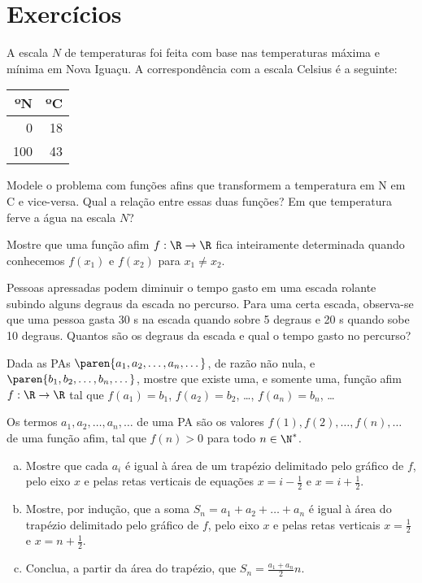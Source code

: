 \section{Exercícios}

\begin{exercise}
A escala $N$ de temperaturas foi feita com base nas temperaturas máxima e mínima em Nova Iguaçu. 
A correspondência com a escala Celsius é a seguinte:
%
\begin{center}
\begin{tabular}{|r|r|}
  \hline
  ºN & ºC \\ \hline
  0 & 18 \\ \hline
  100 & 43 \\ \hline
\end{tabular}
\end{center}
Modele o problema com funções afins que transformem a temperatura em
\tdeg N em \tdeg C e vice-versa. Qual a relação entre essas duas funções? Em
que temperatura ferve a água na escala $N$?
\end{exercise}

\begin{exercise}
Mostre que uma função afim $f: \R \to \R$ fica inteiramente
determinada quando conhecemos $f(x_1)$ e $f(x_2)$ para $x_1 \neq
x_2$.
\end{exercise}

\begin{exercise}
Pessoas apressadas podem diminuir o tempo gasto em uma escada
rolante subindo alguns degraus da escada no percurso. Para uma certa
escada, observa-se que uma pessoa gasta 30 s na escada quando
sobre 5 degraus e 20 s quando sobe 10 degraus. Quantos são os
degraus da escada e qual o tempo gasto no percurso?
\end{exercise}

\begin{exercise}
    Dada as PAs $\paren{a_1, a_2, \dots, a_n, \dots}$, de razão não
nula, e $\paren{b_1, b_2, \dots, b_n, \dots}$, mostre que existe
uma, e somente uma, função afim $f: \R \to \R$ tal que $f(a_1) =
b_1$, $f(a_2) = b_2$, \dots , $f(a_n) = b_n$, \dots
\end{exercise}

\begin{exercise}
    Os termos $a_1, a_2, \dots, a_n, \dots$ de uma PA são os valores
$f(1), f(2), \dots, f(n), \dots$ de uma função afim, tal que $f(n)
>0$ para todo $n \in \N^\ast$.
\begin{enumerate}[(a)]
  \item Mostre que cada $a_i$ é igual à área de um trapézio
  delimitado pelo gráfico de $f$, pelo eixo $x$ e pelas retas
  verticais de equações $x=i - \frac 1 2 $ e $x = i + \frac 1 2$.
  
  \item Mostre, por indução, que a soma $S_n = a_1+a_2+ \dots + a_n$ é igual à
  área do trapézio delimitado pelo gráfico de $f$, pelo eixo $x$ e
  pelas retas verticais $x= \frac 1 2$ e $x = n + \frac 1 2 $.
  \item Conclua, a partir da área do trapézio, que $S_n = \frac{a_1+a_n} 2 n$.
\end{enumerate}
\end{exercise}

